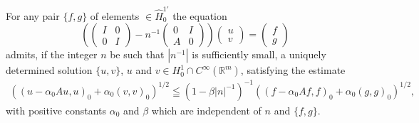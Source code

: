 \begin{lemmau} For any pair $\{f, g\}$ of elements $\in \hat{H}_0^{1'}$ the equation 
\begin{equation}\label{eq:XIV.3.3}
\left(\begin{pmatrix}I & 0 \\ 0 & I\end{pmatrix} - n ^{-1} \begin{pmatrix}0 & I \\ A & 0\end{pmatrix}\right) \begin{pmatrix}u \\ v\end{pmatrix} = \begin{pmatrix}f \\ g\end{pmatrix}
\end{equation}
admits, if the integer $n$ be such that $|n^{-1}|$ is sufficiently small, a uniquely determined solution $\{u, v\}$, $u$ and $v \in H_0^1 \cap C^\infty(\mathbb{R}^{m})$, satisfying the estimate 
\begin{equation}\label{eq:XIV.3.4}
\begin{gathered}
\left((u - \alpha_{0} A u, u) _{0} + \alpha_{0} (v, v) _{0}\right) ^{1/2} \leqq (1 - \beta | n | ^{-1}) ^{-1} \left((f - \alpha_{0} A f, f) _{0} + \alpha_{0} (g, g) _{0}\right) ^{1/2},
\end{gathered}
\end{equation}
with positive constants $\alpha_0$ and $\beta$ which are independent of $n$ and $\{f, g\}$. \end{lemmau}

